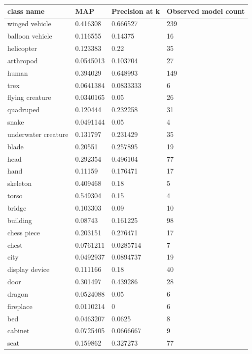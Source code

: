 \documentclass{bigdata}
\begin{document}
\begin{minipage}{\linewidth}
\begin{center}
\begin{tabular}
{ l | l | l | l}
\textbf{class name} & \textbf{MAP} & \textbf{Precision at k} & \textbf{Observed model count} \\ \hline
winged vehicle & 0.416308 & 0.666527 & 239 \\ \hline
balloon vehicle & 0.116555 & 0.14375 & 16 \\ \hline
helicopter & 0.123383 & 0.22 & 35 \\ \hline
arthropod & 0.0545013 & 0.103704 & 27 \\ \hline
human & 0.394029 & 0.648993 & 149 \\ \hline
trex & 0.0641384 & 0.0833333 & 6 \\ \hline
flying creature & 0.0340165 & 0.05 & 26 \\ \hline
quadruped & 0.120444 & 0.232258 & 31 \\ \hline
snake & 0.0491144 & 0.05 & 4 \\ \hline
underwater creature & 0.131797 & 0.231429 & 35 \\ \hline
blade & 0.20551 & 0.257895 & 19 \\ \hline
head & 0.292354 & 0.496104 & 77 \\ \hline
hand & 0.11159 & 0.176471 & 17 \\ \hline
skeleton & 0.409468 & 0.18 & 5 \\ \hline
torso & 0.549304 & 0.15 & 4 \\ \hline
bridge & 0.103303 & 0.09 & 10 \\ \hline
building & 0.08743 & 0.161225 & 98 \\ \hline
chess piece & 0.203151 & 0.276471 & 17 \\ \hline
chest & 0.0761211 & 0.0285714 & 7 \\ \hline
city & 0.0492937 & 0.0894737 & 19 \\ \hline
display device & 0.111166 & 0.18 & 40 \\ \hline
door & 0.301497 & 0.439286 & 28 \\ \hline
dragon & 0.0524088 & 0.05 & 6 \\ \hline
fireplace & 0.0110214 & 0 & 6 \\ \hline
bed & 0.0463207 & 0.0625 & 8 \\ \hline
cabinet & 0.0725405 & 0.0666667 & 9 \\ \hline
seat & 0.159862 & 0.327273 & 77 \\ \hline

\end{tabular}
\end{center}
\end{minipage}
\end{document}
